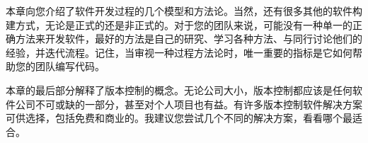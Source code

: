 本章向您介绍了软件开发过程的几个模型和方法论。当然，还有很多其他的软件构建方式，无论是正式的还是非正式的。对于您的团队来说，可能没有一种单一的正确方法来开发软件，最好的方法是自己的研究、学习各种方法、与同行讨论他们的经验，并迭代流程。记住，当审视一种过程方法论时，唯一重要的指标是它如何帮助您的团队编写代码。

本章的最后部分解释了版本控制的概念。无论公司大小，版本控制都应该是任何软件公司不可或缺的一部分，甚至对个人项目也有益。有许多版本控制软件解决方案可供选择，包括免费和商业的。我建议您尝试几个不同的解决方案，看看哪个最适合。